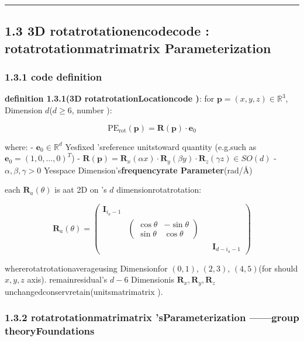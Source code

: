 \documentclass[
  12pt,
]{article}
\begin{document}
\begin{center}\rule{0.5\linewidth}{0.5pt}\end{center}

\subsection{1.3 3D
rotatrotationencodecode : rotatrotationmatrimatrix Parameterization }\label{d-ux65cbux8f6cux7f16ux7801ux65cbux8f6cux77e9ux9635ux53c2ux6570ux5316}

\subsubsection{1.3.1 code definition }\label{ux7f16ux7801ux5b9aux4e49-1}

\textbf{definition  1.3.1(3D rotatrotationLocationcode )}: for 
\(\mathbf{p} = (x, y, z) \in \mathbb{R}^3\), Dimension
\(d\)(\(d \geq 6\), number ):

\[\boxed{\text{PE}_{\text{rot}}(\mathbf{p}) = \mathbf{R}(\mathbf{p}) \cdot \mathbf{e}_0}\]

where:  - \(\mathbf{e}_0 \in \mathbb{R}^d\) Yesfixed 'sreference unitstoward quantity (e.g.such as 
\(\mathbf{e}_0 = (1, 0, \ldots, 0)^T\)) -
\(\mathbf{R}(\mathbf{p}) = \mathbf{R}_x(\alpha x) \cdot \mathbf{R}_y(\beta y) \cdot \mathbf{R}_z(\gamma z) \in SO(d)\)
- \(\alpha, \beta, \gamma > 0\)
Yesspace Dimension's\textbf{frequencyrate Parameter}(rad/Å)

each  \(\mathbf{R}_a(\theta)\) is aat  2D on 's \(d\) dimensionrotatrotation: 

\[\mathbf{R}_a(\theta) = \begin{pmatrix} \mathbf{I}_{i_a-1} & & & \\ & \begin{pmatrix} \cos\theta & -\sin\theta \\ \sin\theta & \cos\theta \end{pmatrix} & & \\ & & & \mathbf{I}_{d-i_a-1} \end{pmatrix}\]

whererotatrotationaverageusing Dimensionfor  \((0,1)\), \((2,3)\),
\((4,5)\)(for should  \(x, y, z\) axis). remainresidual's \(d-6\) Dimensionis 
\(\mathbf{R}_x, \mathbf{R}_y, \mathbf{R}_z\) unchangedconservretain(unitsmatrimatrix ). 

\subsubsection{1.3.2
rotatrotationmatrimatrix 'sParameterization ------group theoryFoundations}\label{ux65cbux8f6cux77e9ux9635ux7684ux53c2ux6570ux5316ux7fa4ux8bbaux57faux7840}
\end{document}

